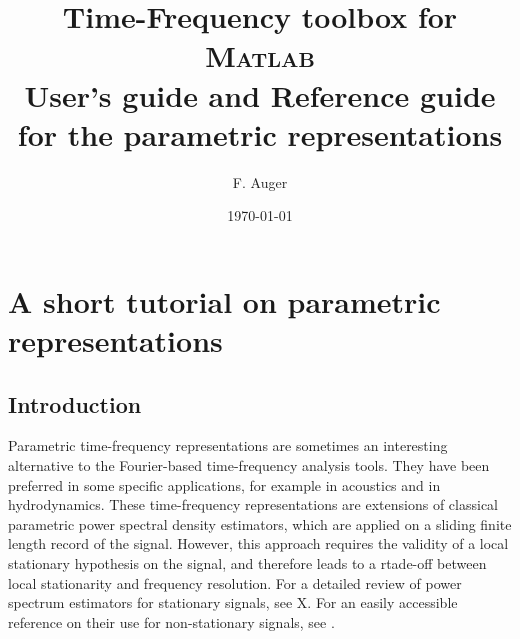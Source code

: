 \documentclass[12pt,a4paper]{report}
\title{Time-Frequency toolbox for M\textsc{atlab}\\[0.5 cm]
User's guide and Reference guide\\
for the parametric representations}
\author{F. Auger}
\date{\today}
\begin{document}
\pagestyle{empty}
\maketitle
\chapter{A short tutorial on parametric representations}
\section{Introduction}
Parametric time-frequency representations are sometimes an interesting alternative 
to the Fourier-based time-frequency analysis tools. They have been preferred in some 
specific applications, for example in acoustics and in hydrodynamics.
These time-frequency representations are extensions of classical parametric
power spectral density estimators, which are applied on a sliding finite length
record of the signal. However, this approach requires the validity of a local stationary 
hypothesis on the signal, and therefore leads to a rtade-off between local stationarity and 
frequency resolution. For a detailed review of power spectrum estimators for
stationary signals, see X. For an easily accessible reference on their use 
for non-stationary signals, see \cite{martin95}.
\end{document}
